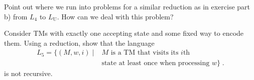 \documentclass{exercise}
\begin{document}

\subtask Point out where we run into problems for a similar reduction as in exercise part
  b) from $L_4$ to $L_{\text{U}}$.  How can we deal with this problem?



Consider TMs with exactly one accepting state and some fixed way to encode them.  Using a reduction,
show that the language
\begin{align*}
  L_5 = \{(M,w,i) \mid {}& M \text{ is a TM that visits its } i\text{th}\\
                         & \text{state at least once when processing } w \}\;.
\end{align*}
is not recursive.

\end{document}
